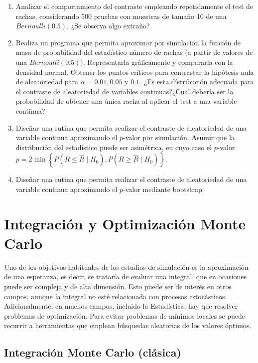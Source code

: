 \documentclass[
]{book}
\theoremstyle{break}
\theoremstyle{definition}
\theoremstyle{definition}
\theoremstyle{definition}
\theoremstyle{definition}
\theoremstyle{remark}
\begin{document}
\begin{enumerate}
\def\labelenumi{\alph{enumi})}
\item
  Analizar el comportamiento del contraste empleando repetidamente
  el test de rachas, considerando 500 pruebas con muestras de
  tamaño 10 de una \(Bernoulli(0.5)\). ¿Se observa algo extraño?
\item
  Realiza un programa que permita aproximar por simulación la
  función de masa de probabilidad del estadístico número de rachas
  (a partir de valores de una \(Bernoulli(0.5)\)). Representarla
  gráficamente y compararla con la densidad normal. Obtener los
  puntos críticos para contrastar la hipótesis nula de
  aleatoriedad para \(\alpha=0.01,0.05\) y \(0.1\). ¿Es esta
  dístribución adecuada para el contraste de aleatoriedad de
  variables continuas?¿Cual debería ser la probabilidad de obtener
  una única racha al aplicar el test a una variable continua?
\item
  Diseñar una rutina que permita realizar el contraste de
  aleatoriedad de una variable continua aproximando el \(p\)-valor
  por simulación. Asumir que la distribución del estadístico puede
  ser asimétrica, en cuyo caso el \(p\)-valor
  \(p=2\min\left\{ P\left( R\leq\hat{R}\mid H_{0}\right) , P\left( R\geq \hat{R}\mid H_{0}\right) \right\}\).
\item
  Diseñar una rutina que permita realizar el contraste de
  aleatoriedad de una variable continua aproximando el \(p\)-valor
  mediante bootstrap.
\end{enumerate}

\hypertarget{cap9}{%
\chapter{Integración y Optimización Monte Carlo}\label{cap9}}

Uno de los objetivos habituales de los estudios de simulación es la aproximación de una esperanza, es decir, se trataría de evaluar una integral, que en ocasiones puede ser compleja y de alta dimensión.
Esto puede ser de interés en otros campos, aunque la integral no esté relacionada con procesos estocásticos.
Adicionalmente, en muchos campos, incluido la Estadística, hay que resolver problemas de optimización.
Para evitar problemas de mínimos locales se puede recurrir a herramientas que emplean búsquedas aleatorias de los valores óptimos.

\hypertarget{integraciuxf3n-monte-carlo-cluxe1sica}{%
\section{Integración Monte Carlo (clásica)}\label{integraciuxf3n-monte-carlo-cluxe1sica}}
\end{document}
